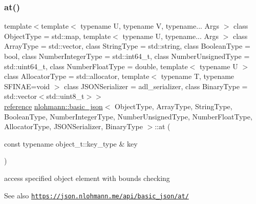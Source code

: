\subsubsection{\texorpdfstring{at()}{at()}\hspace{0.1cm}{\footnotesize\ttfamily [3/6]}}
{\footnotesize\ttfamily template$<$template$<$ typename U, typename V, typename... Args $>$ class Object\+Type = std\+::map, template$<$ typename U, typename... Args $>$ class Array\+Type = std\+::vector, class String\+Type  = std\+::string, class Boolean\+Type  = bool, class Number\+Integer\+Type  = std\+::int64\+\_\+t, class Number\+Unsigned\+Type  = std\+::uint64\+\_\+t, class Number\+Float\+Type  = double, template$<$ typename U $>$ class Allocator\+Type = std\+::allocator, template$<$ typename T, typename S\+F\+I\+N\+A\+E=void $>$ class J\+S\+O\+N\+Serializer = adl\+\_\+serializer, class Binary\+Type  = std\+::vector$<$std\+::uint8\+\_\+t$>$$>$ \\
\hyperlink{classnlohmann_1_1basic__json_a220ae98554a76205fb7f8822d36b2d5a}{reference} \hyperlink{classnlohmann_1_1basic__json}{nlohmann\+::basic\+\_\+json}$<$ Object\+Type, Array\+Type, String\+Type, Boolean\+Type, Number\+Integer\+Type, Number\+Unsigned\+Type, Number\+Float\+Type, Allocator\+Type, J\+S\+O\+N\+Serializer, Binary\+Type $>$\+::at (\begin{DoxyParamCaption}\item[{const typename object\+\_\+t\+::key\+\_\+type \&}]{key }\end{DoxyParamCaption})\hspace{0.3cm}{\ttfamily [inline]}}



access specified object element with bounds checking 

\begin{DoxySeeAlso}{See also}
\href{https://json.nlohmann.me/api/basic_json/at/}{\tt https\+://json.\+nlohmann.\+me/api/basic\+\_\+json/at/} 
\end{DoxySeeAlso}
\mbox{\label{classnlohmann_1_1basic__json_a229964ee10c92ba89ae4fba786fe6b50}} 

